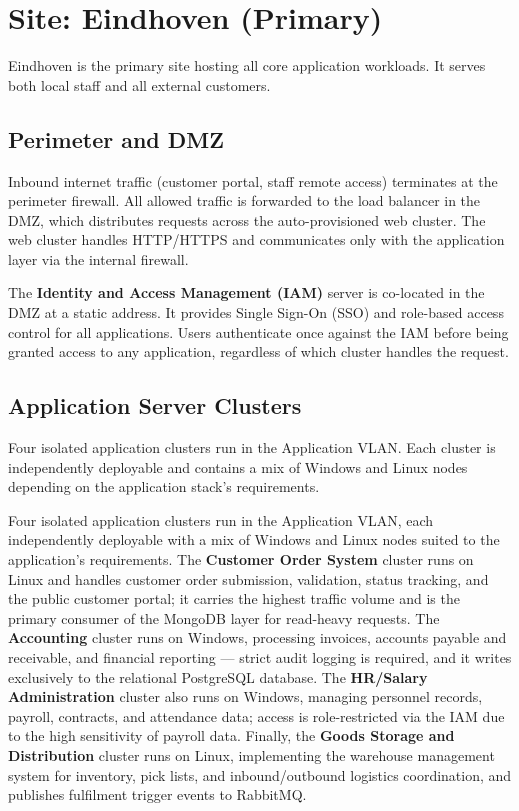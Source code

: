\section{Site: Eindhoven (Primary)}

Eindhoven is the primary site hosting all core application workloads. It serves both local staff and all external customers.

\subsection{Perimeter and DMZ}

Inbound internet traffic (customer portal, staff remote access) terminates at the perimeter firewall. All allowed traffic is forwarded to the load balancer in the DMZ, which distributes requests across the auto-provisioned web cluster. The web cluster handles HTTP/HTTPS and communicates only with the application layer via the internal firewall.

The \textbf{Identity and Access Management (IAM)} server is co-located in the DMZ at a static address. It provides Single Sign-On (SSO) and role-based access control for all applications. Users authenticate once against the IAM before being granted access to any application, regardless of which cluster handles the request.

\subsection{Application Server Clusters}

Four isolated application clusters run in the Application VLAN. Each cluster is independently deployable and contains a mix of Windows and Linux nodes depending on the application stack's requirements.

\label{tab:appclusters}Four isolated application clusters run in the Application VLAN, each independently deployable with a mix of Windows and Linux nodes suited to the application's requirements. The \textbf{Customer Order System} cluster runs on Linux and handles customer order submission, validation, status tracking, and the public customer portal; it carries the highest traffic volume and is the primary consumer of the MongoDB layer for read-heavy requests. The \textbf{Accounting} cluster runs on Windows, processing invoices, accounts payable and receivable, and financial reporting --- strict audit logging is required, and it writes exclusively to the relational PostgreSQL database. The \textbf{HR/Salary Administration} cluster also runs on Windows, managing personnel records, payroll, contracts, and attendance data; access is role-restricted via the IAM due to the high sensitivity of payroll data. Finally, the \textbf{Goods Storage and Distribution} cluster runs on Linux, implementing the warehouse management system for inventory, pick lists, and inbound/outbound logistics coordination, and publishes fulfilment trigger events to RabbitMQ.


